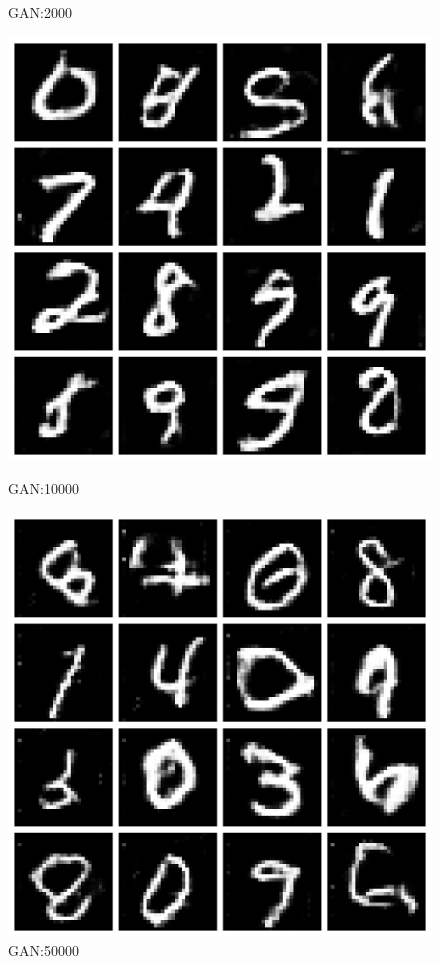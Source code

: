 \documentclass[a4paper,11pt]{jsarticle}
\begin{document}
\begin{figure}[H]
\begin{minipage}[b]{0.245\linewidth}
    \caption{GAN:2000}
  \end{minipage}
  \begin{minipage}[b]{0.245\linewidth}
    \centering
    \includegraphics[keepaspectratio, width=0.9\linewidth]{../AdvanceB/Image/result_10400.png}
    \caption{GAN:10000}
  \end{minipage}
  \begin{minipage}[b]{0.245\linewidth}
    \centering
    \includegraphics[keepaspectratio, width=0.9\linewidth]{../AdvanceB/Image/result_50000.png}
    \caption{GAN:50000}
  \end{minipage}
\end{figure}
\end{document}
